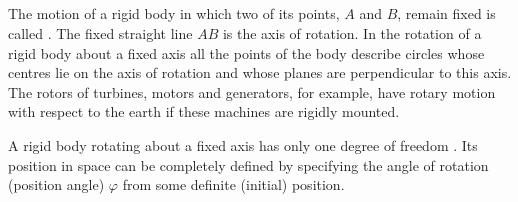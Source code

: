 \subsection{}\label{1.5.2} The motion of a rigid body in which two of its points, $A$ and $B$, remain fixed is called . The fixed straight line $AB$ is the axis of rotation. In the rotation of a rigid body about a fixed axis all the points of the body describe circles whose centres lie on the axis of rotation and whose planes are perpendicular to this axis. The rotors of turbines, motors and generators, for exam­ple, have rotary motion with respect to the earth if these ma­chines are rigidly mounted.

A rigid body rotating about a fixed axis has only one degree of freedom . Its position in space can be completely defined by specifying the angle of rotation (position angle) $\varphi$ from some definite (initial) position.


